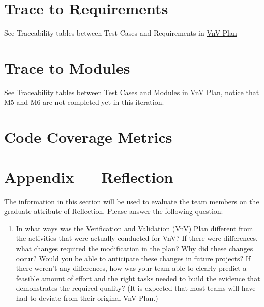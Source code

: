 \documentclass[12pt, titlepage]{article}
\begin{document}
\section{Trace to Requirements}
See Traceability tables between Test Cases and Requirements in \href{https://github.com/beatlepie/4G06CapstoneProjectTeam2/blob/main/docs/VnVPlan/VnVPlan.pdf}{VnV Plan}
\section{Trace to Modules}		
See Traceability tables between Test Cases and Modules in \href{https://github.com/beatlepie/4G06CapstoneProjectTeam2/blob/main/docs/VnVPlan/VnVPlan.pdf}{VnV Plan}, notice that M5 and M6 are not completed yet in this iteration.

\section{Code Coverage Metrics}




\newpage{}
\section*{Appendix --- Reflection}

The information in this section will be used to evaluate the team members on the
graduate attribute of Reflection.  Please answer the following question:

\begin{enumerate}
  \item In what ways was the Verification and Validation (VnV) Plan different
  from the activities that were actually conducted for VnV?  If there were
  differences, what changes required the modification in the plan?  Why did
  these changes occur?  Would you be able to anticipate these changes in future
  projects?  If there weren't any differences, how was your team able to clearly
  predict a feasible amount of effort and the right tasks needed to build the
  evidence that demonstrates the required quality?  (It is expected that most
  teams will have had to deviate from their original VnV Plan.)
\end{enumerate}
\end{document}
